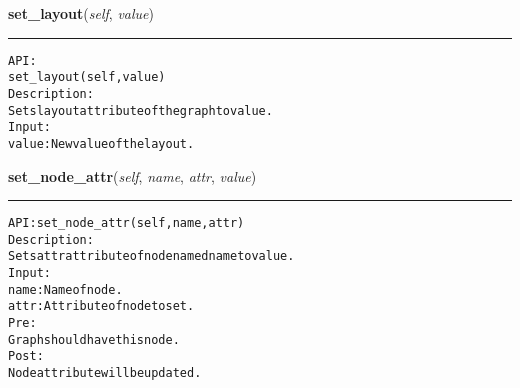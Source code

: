     \vspace{0.5ex}

\hspace{.8\funcindent}\begin{boxedminipage}{\funcwidth}

    \raggedright \textbf{set\_layout}(\textit{self}, \textit{value})

    \vspace{-1.5ex}

    \rule{\textwidth}{0.5\fboxrule}
\setlength{\parskip}{2ex}
\begin{alltt}

API:
    set\_layout(self, value)
Description:
Sets layout attribute of the graph to value.
Input:
    value: New value of the layout.
\end{alltt}

\setlength{\parskip}{1ex}
    \end{boxedminipage}

    \label{coinor:gimpy:graph:Graph:set_node_attr}

    \vspace{0.5ex}

\hspace{.8\funcindent}\begin{boxedminipage}{\funcwidth}

    \raggedright \textbf{set\_node\_attr}(\textit{self}, \textit{name}, \textit{attr}, \textit{value})

    \vspace{-1.5ex}

    \rule{\textwidth}{0.5\fboxrule}
\setlength{\parskip}{2ex}
\begin{alltt}

API: set\_node\_attr(self, name, attr)
Description:
Sets attr attribute of node named name to value.
Input:
    name: Name of node.
    attr: Attribute of node to set.
Pre:
    Graph should have this node.
Post:
    Node attribute will be updated.
\end{alltt}

\setlength{\parskip}{1ex}
    \end{boxedminipage}

    \label{coinor:gimpy:graph:Graph:show_flow}

